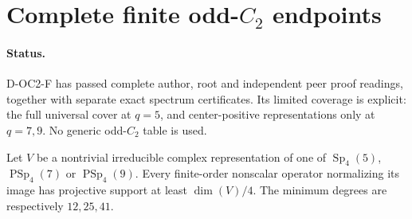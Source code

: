 \section{Complete finite odd-$C_2$ endpoints}

\paragraph{Status.}
D-OC2-F has passed complete author, root and independent peer proof
readings, together with separate exact spectrum certificates. Its limited coverage
is explicit: the full universal cover at $q=5$, and center-positive
representations only at $q=7,9$. No generic odd-$C_2$ table is used.

\begin{lemma}
Let $V$ be a nontrivial irreducible complex representation of one of
$\operatorname{Sp}_4(5)$, $\operatorname{PSp}_4(7)$ or
$\operatorname{PSp}_4(9)$. Every finite-order nonscalar operator
normalizing its image has projective support at least $\dim(V)/4$.
The minimum degrees are respectively $12,25,41$.
\end{lemma}

